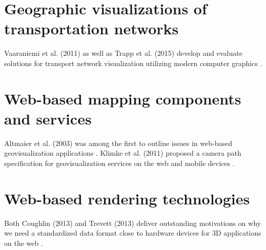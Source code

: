   \section{Geographic visualizations of transportation networks}
    Vaaraniemi et al. (2011) as well as Trapp et al. (2015) develop and evaluate solutions for transport network visualization utilizing modern computer graphics \cite{Vaaraniemi2011}\cite{Trapp2015}.\par
  \section{Web-based mapping components and services}
    Altmaier et al. (2003) was among the first to outline issues in web-based geovisualization applications \cite{Altmaier2003}. Klimke et al. (2011) proposed a camera path specification for geovisualization services on the web and mobile devices \cite{klimke2013service}.\par
  \section{Web-based rendering technologies}
    Both Coughlin (2013) and Trevett (2013) deliver outstanding motivations on why we need a standardized data format close to hardware devices for 3D applications on the web \cite{Coughlin2014}\cite{Trevett2012}.\par
